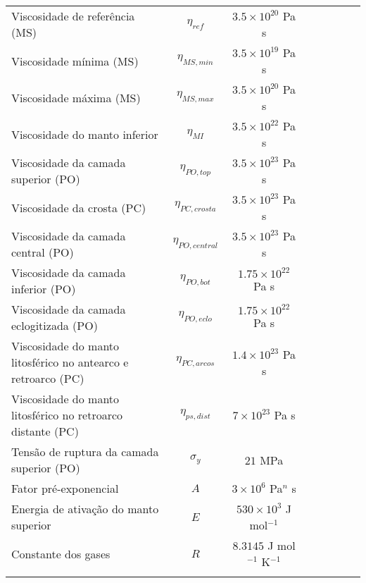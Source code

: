 \begin{center}
\begin{longtable}{lccccccc}
        Viscosidade de referência (MS) & $\eta_{ref}$ & $3.5 \times 10^{20}$ Pa s \\
        Viscosidade mínima (MS) & $\eta_{MS,min}$ & $3.5 \times 10^{19}$ Pa s \\
        Viscosidade máxima (MS) & $\eta_{MS,max}$ & $3.5 \times 10^{20}$ Pa s \\
        Viscosidade do manto inferior & $\eta_{MI}$ & $3.5 \times 10^{22}$ Pa s \\
        Viscosidade da camada superior (PO) & $\eta_{PO,top}$ & $3.5 \times 10^{23}$ Pa s \\
        Viscosidade da crosta (PC) & $\eta_{PC,crosta}$ & $3.5 \times 10^{23}$ Pa s \\
        Viscosidade da camada central (PO) & $\eta_{PO,central}$ & $3.5 \times 10^{23}$ Pa s \\
        Viscosidade da camada inferior (PO) & $\eta_{PO,bot}$ & $1.75 \times 10^{22}$ Pa s \\
        Viscosidade da camada eclogitizada (PO) & $\eta_{PO,eclo}$ & $1.75 \times 10^{22}$ Pa s \\
        Viscosidade do manto litosférico no antearco e retroarco  (PC) & $\eta_{PC,arcos}$ & $1.4 \times 10^{23}$ Pa s \\
        Viscosidade do manto litosférico no retroarco distante (PC) & $\eta_{ps,dist}$ & $7 \times 10^{23}$ Pa s \\
        Tensão de ruptura da camada superior (PO) & $\sigma_{y}$ & $21$ MPa \\
        Fator pré-exponencial & $A$ & $3\times 10^{6}$ Pa$^n$ s \\
        Energia de ativação do manto superior & $E$ & $530\times 10^3$ J mol$^{-1}$ \\
        Constante dos gases & $R$ & $8.3145$ J mol$^{-1}$ K$^{-1}$ \\

        \label{table:parametrosSimulacao}
    \end{longtable}
\end{center}